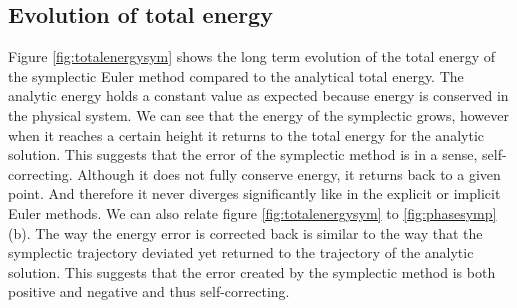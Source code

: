 \documentclass{article}
\begin{document}
\subsection{Evolution of total energy}
Figure \ref{fig:totalenergysym} shows the long term evolution of the total energy of the symplectic Euler method compared to the analytical total energy. The analytic energy holds a constant value as expected because energy is conserved in the physical system. We can see that the energy of the symplectic grows, however when it reaches a certain height it returns to the total energy for the analytic solution. This suggests that the error of the symplectic method is in a sense, self-correcting. Although it does not fully conserve energy, it returns back to a given point. And therefore it never diverges significantly like in the explicit or implicit Euler methods. We can also relate figure \ref{fig:totalenergysym} to \ref{fig:phasesymp}(b). The way the energy error is corrected back is similar to the way that the symplectic trajectory deviated yet returned to the trajectory of the analytic solution. This suggests that the error created by the symplectic method is both positive and negative and thus self-correcting. 
\end{document}
